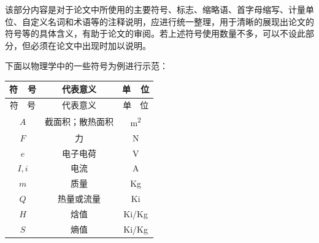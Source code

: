 

\begin{notation}

该部分内容是对于论文中所使用的主要符号、标志、缩略语、首字母缩写、计量单位、自定义名词和术语等的注释说明，应进行统一整理，用于清晰的展现出论文的符号等的具体含义，有助于论文的审阅。若上述符号使用数量不多，可以不设此部分，但必须在论文中出现时加以说明。

下面以物理学中的一些符号为例进行示范：

{\setlength{\tabcolsep}{15mm}%
\begin{longtable}{ccc} %

	\toprule
	符~~号 & 代表意义 & 单~~位\\
    \endfirsthead %
    \midrule
    符~~号 & 代表意义 & 单~~位\\
    \midrule
    \endhead %
    \midrule
    \endfoot %
    \bottomrule
    \endlastfoot %
    $A$ & 截面积；散热面积 & \unit{m^2} \\
    $F$ & 力 & \unit{N} \\
    $e$ & 电子电荷 & \unit{V} \\
    $I, i$ & 电流 & \unit{A} \\
    $m$ & 质量 & \unit{Kg} \\
    $Q$ & 热量或流量 & \unit{Ki} \\
    $H$ & 焓值 & \unit{Ki/Kg} \\
    $S$ & 熵值 & \unit{Ki/Kg} \\
\end{longtable}}%

\end{notation}
